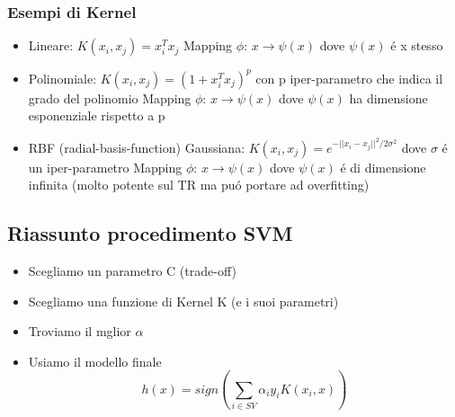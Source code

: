 \documentclass{article}
\begin{document}
\subsubsection{Esempi di Kernel}
\begin{itemize}
    \item Lineare: $K(x_i,x_j)=x_i^Tx_j$ \newline
        Mapping $\phi$: $x \rightarrow \psi(x)$ dove $\psi(x)$ é x stesso
    \item Polinomiale: $K(x_i,x_j)=(1+x_i^Tx_j)^p$ con p iper-parametro che indica il grado del polinomio \newline
        Mapping $\phi$: $x \rightarrow \psi(x)$ dove $\psi(x)$ ha dimensione esponenziale rispetto a p
    \item RBF (radial-basis-function) Gaussiana: $K(x_i,x_j)=e^{-||x_i-x_j||^2/2\sigma^2}$ dove $\sigma$ é un iper-parametro\newline
        Mapping $\phi$: $x \rightarrow \psi(x)$ dove $\psi(x)$ é di dimensione infinita \newline
        (molto potente sul TR ma puó portare ad overfitting)
\end{itemize}

\subsection{Riassunto procedimento SVM}
\begin{itemize}
    \item Scegliamo un parametro C (trade-off)
    \item Scegliamo una funzione di Kernel K (e i suoi parametri)
    \item Troviamo il mglior $\alpha$
    \item Usiamo il modello finale \[h(x)=sign(\sum_{i\in SV} \alpha_iy_iK(x_i,x))\]
\end{itemize}
\end{document}
